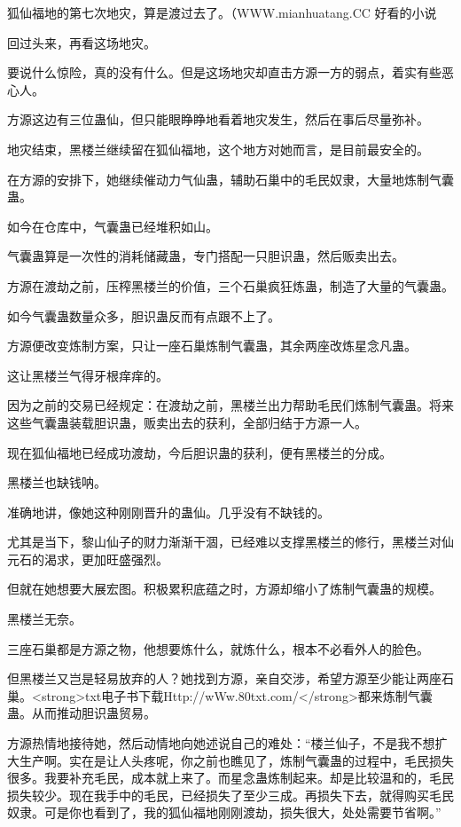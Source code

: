 
\begin{this_body}

狐仙福地的第七次地灾，算是渡过去了。（WWW.mianhuatang.CC 好看的小说

回过头来，再看这场地灾。

要说什么惊险，真的没有什么。但是这场地灾却直击方源一方的弱点，着实有些恶心人。

方源这边有三位蛊仙，但只能眼睁睁地看着地灾发生，然后在事后尽量弥补。

地灾结束，黑楼兰继续留在狐仙福地，这个地方对她而言，是目前最安全的。

在方源的安排下，她继续催动力气仙蛊，辅助石巢中的毛民奴隶，大量地炼制气囊蛊。

如今在仓库中，气囊蛊已经堆积如山。

气囊蛊算是一次性的消耗储藏蛊，专门搭配一只胆识蛊，然后贩卖出去。

方源在渡劫之前，压榨黑楼兰的价值，三个石巢疯狂炼蛊，制造了大量的气囊蛊。

如今气囊蛊数量众多，胆识蛊反而有点跟不上了。

方源便改变炼制方案，只让一座石巢炼制气囊蛊，其余两座改炼星念凡蛊。

这让黑楼兰气得牙根痒痒的。

因为之前的交易已经规定：在渡劫之前，黑楼兰出力帮助毛民们炼制气囊蛊。将来这些气囊蛊装载胆识蛊，贩卖出去的获利，全部归结于方源一人。

现在狐仙福地已经成功渡劫，今后胆识蛊的获利，便有黑楼兰的分成。

黑楼兰也缺钱呐。

准确地讲，像她这种刚刚晋升的蛊仙。几乎没有不缺钱的。

尤其是当下，黎山仙子的财力渐渐干涸，已经难以支撑黑楼兰的修行，黑楼兰对仙元石的渴求，更加旺盛强烈。

但就在她想要大展宏图。积极累积底蕴之时，方源却缩小了炼制气囊蛊的规模。

黑楼兰无奈。

三座石巢都是方源之物，他想要炼什么，就炼什么，根本不必看外人的脸色。

但黑楼兰又岂是轻易放弃的人？她找到方源，亲自交涉，希望方源至少能让两座石巢。<strong>txt电子书下载Http://wWw.80txt.com/</strong>都来炼制气囊蛊。从而推动胆识蛊贸易。

方源热情地接待她，然后动情地向她述说自己的难处：“楼兰仙子，不是我不想扩大生产啊。实在是让人头疼呢，你之前也瞧见了，炼制气囊蛊的过程中，毛民损失很多。我要补充毛民，成本就上来了。而星念蛊炼制起来。却是比较温和的，毛民损失较少。现在我手中的毛民，已经损失了至少三成。再损失下去，就得购买毛民奴隶。可是你也看到了，我的狐仙福地刚刚渡劫，损失很大，处处需要节省啊。”


\end{this_body}
